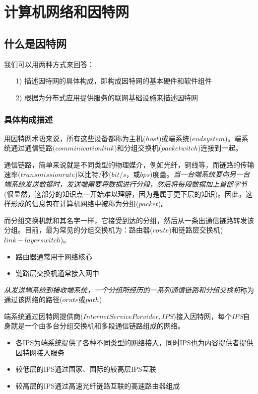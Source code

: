 \chapter{计算机网络和因特网}

\section{什么是因特网}

    我们可以用两种方式来回答：

\begin{itemize}
    \item [1)] 描述因特网的具体构成，即构成因特网的基本硬件和软件组件
    \item [2)] 根据为分布式应用提供服务的联网基础设施来描述因特网
\end{itemize}

\subsection{具体构成描述}

    用因特网术语来说，所有这些设备都称为主机($host$)或端系统($end system$)。端系统通过通信链路($comminication link$)和分组交换机($packet witch$)连接到一起。

    通信链路，简单来说就是不同类型的物理媒介，例如光纤，铜线等，而链路的传输速率($transmission rate$)以比特/秒($bit/s$，或$bps$)度量。\emph{当一台端系统要向另一台端系统发送数据时，发送端需要将数据进行分段，然后将每段数据加上首部字节}(很显然，这部分的知识点一开始难以理解，因为是属于更下层的知识)。因此，这样形成的信息包在计算机网络中被称为分组($packet$)。

    而分组交换机就和其名字一样，它接受到达的分组，然后从一条出通信链路转发该分组。目前，最为常见的分组交换机为：路由器($route$)和链路层交换机($link-layer switch$)。

\begin{itemize}
    \item 路由器通常用于网络核心
    \item 链路层交换机通常接入网中
\end{itemize}

    \emph{从发送端系统到接收端系统，一个分组所经历的一系列通信链路和分组交换机}称为通过该网络的路径($orute$或$path$)

    端系统通过因特网提供商($Internet Service Porvider, IPS$)接入因特网，每个\emph{IPS}自身就是一个由多台分组交换机和多段通信链路组成的网络。

\begin{itemize}
    \item 各IPS为端系统提供了各种不同类型的网络接入，同时IPS也为内容提供者提供因特网接入服务
    \item 较低层的IPS通过国家、国际的较高层IPS互联
    \item 较高层的IPS通过高速光纤链路互联的高速路由器组成
\end{itemize}

